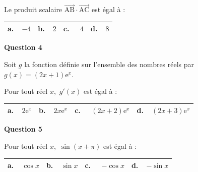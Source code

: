 \documentclass[10pt]{article}
\providecommand{\vect}[1]{\overrightarrow{#1}}
\begin{document}
Le produit scalaire $\vect{\text{AB}} \cdot \vect{\text{AC}}$ est égal à :

\begin{center}
\begin{tabularx}{\linewidth}{|*{4}{X|}}\hline
\textbf{a.~~}$- 4$&\textbf{b.~~}$2$&\textbf{c.~~} $4$&\textbf{d.~~}$8$\\ \hline
\end{tabularx}
\end{center}

\textbf{Question 4}

Soit $g$ la fonction définie sur l'ensemble des nombres réels par $g(x) = (2x + 1)\text{e}^x$.

Pour tout réel $x$,\, $g'(x)$ est égal à :

\begin{center}
\begin{tabularx}{\linewidth}{|*{4}{X|}}\hline
\textbf{a.~~}$2\text{e}^x$&\textbf{b.~~}$2x\text{e}^x$&\textbf{c.~~} $ (2x +2)\text{e}^x$&
\textbf{d.~~}$(2x +3)\text{e}^x$\\ \hline
\end{tabularx}
\end{center}

\textbf{Question 5}

Pour tout réel $x$,\, $\sin(x + \pi)$ est égal à :

\begin{center}
\begin{tabularx}{\linewidth}{|*{4}{X|}}\hline
\textbf{a.~~}$\cos x$&\textbf{b.~~}$\sin x$&\textbf{c.~~} $- \cos x$&\textbf{d.~~}$- \sin x$\\ \hline
\end{tabularx}
\end{center}

\bigskip
\end{document}
